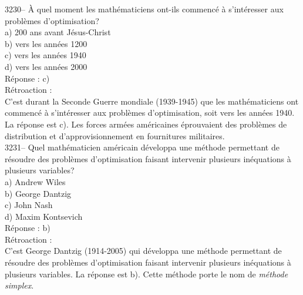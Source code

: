 \documentclass[letterpaper, 12pt]{article}
\begin{document}
3230-- \`A quel moment les math\'ematiciens ont-ils commenc\'e \`a s'int\'eresser aux probl\`emes d'optimisation?\\

a) 200 ans avant J\'esus-Christ\\
b) vers les ann\'ees 1200\\
c) vers les ann\'ees 1940\\
d) vers les ann\'ees 2000\\

R\'eponse : c)\\

R\'etroaction :\\
C'est durant la Seconde Guerre mondiale (1939-1945) que les math\'ematiciens ont commenc\'e \`a s'int\'eresser aux probl\`emes d'optimisation, soit vers les ann\'ees 1940. La r\'eponse est c). Les forces arm\'ees am\'ericaines \'eprouvaient des probl\`emes de distribution et d'approvisionnement en fournitures militaires.\\



3231-- Quel math\'ematicien am\'ericain d\'eveloppa une m\'ethode permettant de r\'esoudre des probl\`emes d'optimisation faisant intervenir plusieurs in\'equations \`a plusieurs variables?\\

a) Andrew Wiles\\
b) George Dantzig\\
c) John Nash\\
d) Maxim Kontsevich\\

R\'eponse : b)\\

R\'etroaction :\\
C'est George Dantzig (1914-2005) qui d\'eveloppa une m\'ethode permettant de r\'esoudre des probl\`emes d'optimisation faisant intervenir plusieurs in\'equations \`a plusieurs variables. La r\'eponse est b).  Cette m\'ethode porte le nom de \emph{m\'ethode simplex}.\\
\end{document}

